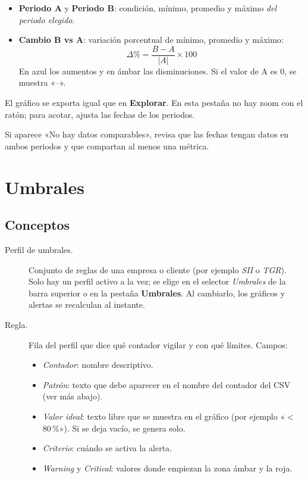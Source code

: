 \documentclass[11pt,a4paper,oneside]{report}
\newcommand{\pestana}[1]{\textsf{\textbf{\color{acento}#1}}}
\newcommand{\campo}[1]{\textsf{\textit{#1}}}
\begin{document}
\begin{itemize}
  \item \textbf{Periodo A} y \textbf{Periodo B}: condición, mínimo, promedio y
        máximo \emph{del periodo elegido}.
  \item \textbf{Cambio B vs A}: variación porcentual de mínimo, promedio y
        máximo:
        \[
          \Delta\% = \frac{B - A}{|A|} \times 100
        \]
        En azul los aumentos y en ámbar las disminuciones. Si el valor de A es
        0, se muestra «–».
\end{itemize}

El gráfico se exporta igual que en \pestana{Explorar}. En esta pestaña no hay
zoom con el ratón; para acotar, ajusta las fechas de los periodos.

Si aparece «No hay datos comparables», revisa que las fechas tengan datos en
ambos periodos y que compartan al menos una métrica.

\chapter{Umbrales}

\section{Conceptos}

\begin{description}
  \item[Perfil de umbrales.] Conjunto de reglas de una empresa o cliente
    (por ejemplo \emph{SII} o \emph{TGR}). Solo hay un perfil activo a la vez;
    se elige en el selector \campo{Umbrales} de la barra superior o en la
    pestaña \pestana{Umbrales}. Al cambiarlo, los gráficos y alertas se
    recalculan al instante.
  \item[Regla.] Fila del perfil que dice qué contador vigilar y con qué
    límites. Campos:
    \begin{itemize}
      \item \campo{Contador}: nombre descriptivo.
      \item \campo{Patrón}: texto que debe aparecer en el nombre del contador
            del CSV (ver más abajo).
      \item \campo{Valor ideal}: texto libre que se muestra en el gráfico
            (por ejemplo «$<$ 80\,\%»). Si se deja vacío, se genera solo.
      \item \campo{Criterio}: cuándo se activa la alerta.
      \item \campo{Warning} y \campo{Critical}: valores donde empiezan la zona
            ámbar y la roja.
    \end{itemize}
\end{description}
\end{document}
